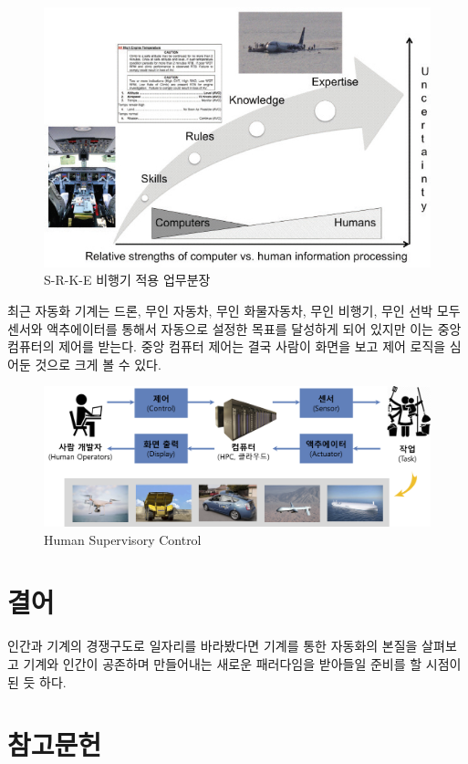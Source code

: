 \documentclass[smallextended]{svjour3}       %
\begin{document}
\begin{figure}

{\centering \includegraphics[width=0.77\linewidth]{fig/role-allocation-skill-rules-experties} 

}

\caption{S-R-K-E 비행기 적용 업무분장}\label{fig:unnamed-chunk-7}
\end{figure}

최근 자동화 기계는 드론, 무인 자동차, 무인 화물자동차, 무인 비행기, 무인
선박 모두 센서와 액추에이터를 통해서 자동으로 설정한 목표를 달성하게
되어 있지만 이는 중앙 컴퓨터의 제어를 받는다. 중앙 컴퓨터 제어는 결국
사람이 화면을 보고 제어 로직을 심어둔 것으로 크게 볼 수 있다.

\begin{figure}

{\centering \includegraphics[width=0.77\linewidth]{fig/human-supervisory-control} 

}

\caption{Human Supervisory Control}\label{fig:unnamed-chunk-8}
\end{figure}

\hypertarget{conclusion}{%
\section{결어}\label{conclusion}}

인간과 기계의 경쟁구도로 일자리를 바라봤다면 기계를 통한 자동화의 본질을
살펴보고 기계와 인간이 공존하며 만들어내는 새로운 패러다임을 받아들일
준비를 할 시점이 된 듯 하다.

\hypertarget{uxcc38uxace0uxbb38uxd5cc}{%
\section{참고문헌}\label{uxcc38uxace0uxbb38uxd5cc}}

\cite{brynjolfsson2014second} \cite{ford2015rise}
\cite{kaplan2015humans} \cite{cummings2014man} \cite{brownlee_2019}
\cite{chang_2017} \cite{ahlstrom_2019} \cite{wikipedia_2019}
\cite{hui_2018}



\end{document}
